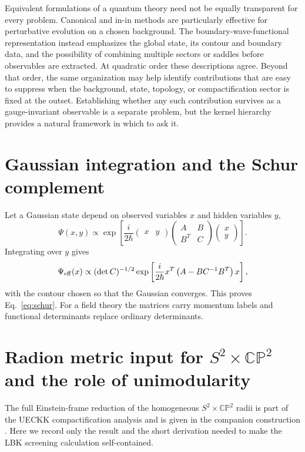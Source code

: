 \documentclass[aps,prd,twocolumn,superscriptaddress,nofootinbib,longbibliography,floatfix]{revtex4-2}
\newcommand{\CP}{\mathbb{CP}}
\begin{document}
Equivalent formulations of a quantum theory need not be equally transparent for every problem. Canonical and in-in methods are particularly effective for perturbative evolution on a chosen background. The boundary-wave-functional representation instead emphasizes the global state, its contour and boundary data, and the possibility of combining multiple sectors or saddles before observables are extracted. At quadratic order these descriptions agree. Beyond that order, the same organization may help identify contributions that are easy to suppress when the background, state, topology, or compactification sector is fixed at the outset. Establishing whether any such contribution survives as a gauge-invariant observable is a separate problem, but the kernel hierarchy provides a natural framework in which to ask it.

\appendix
\section{Gaussian integration and the Schur complement}
Let a Gaussian state depend on observed variables $x$ and hidden variables $y$,
\begin{equation}
\Psi(x,y)\propto\exp\left[\frac{i}{2\hbar}
\begin{pmatrix}x&y\end{pmatrix}
\begin{pmatrix}A&B\\B^T&C\end{pmatrix}
\begin{pmatrix}x\\y\end{pmatrix}\right].
\end{equation}
Integrating over $y$ gives
\begin{equation}
\Psi_{\rm eff}(x)\propto
(\det C)^{-1/2}\exp\left[\frac{i}{2\hbar}x^T
\left(A-BC^{-1}B^T\right)x\right],
\end{equation}
with the contour chosen so that the Gaussian converges. This proves Eq.~\eqref{eq:schur}. For a field theory the matrices carry momentum labels and functional determinants replace ordinary determinants.




\section{Radion metric input for $S^2\times\CP^2$ and the role of unimodularity}
\label{app:unimodularG}
The full Einstein-frame reduction of the homogeneous $S^2\times\CP^2$ radii is part of the UECKK compactification analysis and is given in the companion construction \cite{ShayaUECKK2026}. Here we record only the result and the short derivation needed to make the LBK screening calculation self-contained.
\end{document}
